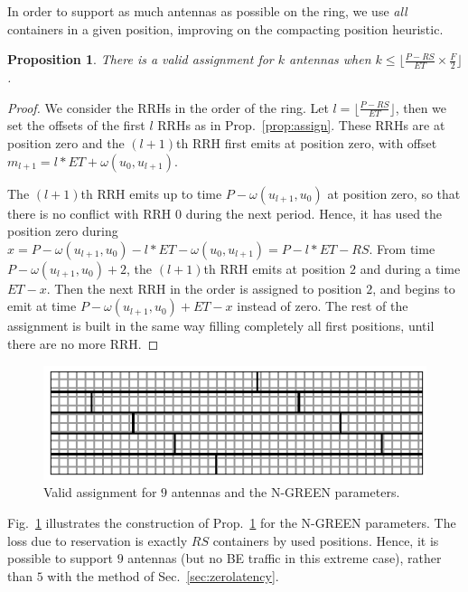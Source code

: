 \documentclass[10pt, conference, letterpaper]{IEEEtran}
\newtheorem{prop}{Proposition}
\begin{document}
In order to support as much antennas as possible on the ring, we use \emph{all} containers in a given position, improving on the compacting position heuristic. 

\begin{prop}\label{prop:filling}
 There is a valid assignment for $k$ antennas when $k \leq \lfloor \frac{P- RS}{ET} \times \frac{F}{2}\rfloor$.
\end{prop}
\begin{proof}
 We consider the RRHs in the order of the ring.
 Let $l = \lfloor \frac{P- RS}{ET}\rfloor$, then we set the offsets of the first $l$ RRHs as in Prop.~\ref{prop:assign}. These RRHs are at position zero and the $(l+1)$th RRH first emits at position zero, with offset $m_{l+1} = l*ET + \omega(u_0,u_{l+1})$. 
 
 The $(l+1)$th RRH emits up to time $P - \omega(u_{l+1},u_{0})$ at position zero, so that there is no conflict with RRH $0$ during the next period.
 Hence, it has used the position zero during $x = P - \omega(u_{l+1},u_{0}) - l*ET - \omega(u_0,u_{l+1}) = P - l*ET - RS$. From time $P - \omega(u_{l+1},u_{0}) + 2$, the $(l+1)$th RRH emits at position $2$ and during a time $ET - x$. Then the next RRH in the order is assigned to position $2$, and begins to emit at time $P - \omega(u_{l+1},u_{0}) + ET -x$ instead of zero. The rest of the assignment is built in the same way filling completely all first positions, until there are no more RRH.  
\end{proof}
 \vspace{-0.4cm}
\begin{figure}[h]
\begin{center}   

      \includegraphics[scale=0.8]{split}
     \caption{Valid assignment for $9$ antennas and the N-GREEN parameters.}   \label{fig:split}
\end{center}
  \end{figure}
  \vspace{-0.4cm}
  
Fig.~\ref{fig:split} illustrates the construction of Prop.~\ref{prop:filling} for the N-GREEN parameters. The loss due to reservation is exactly $RS$ containers by used positions. Hence, it is possible to support $9$ antennas (but no BE traffic in this extreme case),
rather than $5$ with the method of Sec.~\ref{sec:zerolatency}.
\end{document}
